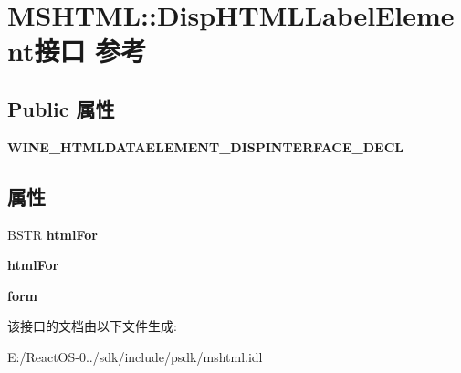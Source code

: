 \hypertarget{interface_m_s_h_t_m_l_1_1_disp_h_t_m_l_label_element}{}\section{M\+S\+H\+T\+ML\+:\+:Disp\+H\+T\+M\+L\+Label\+Element接口 参考}
\label{interface_m_s_h_t_m_l_1_1_disp_h_t_m_l_label_element}
\subsection*{Public 属性}
\begin{DoxyCompactItemize}
\item 
\mbox{\label{interface_m_s_h_t_m_l_1_1_disp_h_t_m_l_label_element_a902c76ed42dff5243de6775bdaaec104}} 
{\bfseries W\+I\+N\+E\+\_\+\+H\+T\+M\+L\+D\+A\+T\+A\+E\+L\+E\+M\+E\+N\+T\+\_\+\+D\+I\+S\+P\+I\+N\+T\+E\+R\+F\+A\+C\+E\+\_\+\+D\+E\+CL}
\end{DoxyCompactItemize}
\subsection*{属性}
\begin{DoxyCompactItemize}
\item 
\mbox{\label{interface_m_s_h_t_m_l_1_1_disp_h_t_m_l_label_element_a3caca097e21bd4ed5bf16df76fc7263d}} 
B\+S\+TR {\bfseries html\+For}
\item 
\mbox{\label{interface_m_s_h_t_m_l_1_1_disp_h_t_m_l_label_element_aeda390f21e15279eea59cc658835c5cf}} 
{\bfseries html\+For}
\item 
\mbox{\label{interface_m_s_h_t_m_l_1_1_disp_h_t_m_l_label_element_ac3f9cc824e394fe51bf61dd122475c16}} 
{\bfseries form}
\end{DoxyCompactItemize}


该接口的文档由以下文件生成\+:\begin{DoxyCompactItemize}
\item 
E\+:/\+React\+O\+S-\/0../sdk/include/psdk/mshtml.\+idl\end{DoxyCompactItemize}
